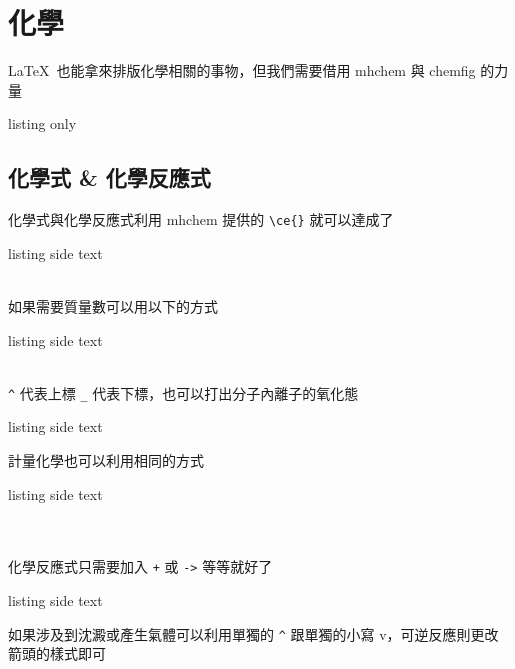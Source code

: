 \chapter{化學}

\LaTeX\ 也能拿來排版化學相關的事物，但我們需要借用 mhchem 與 chemfig 的力量

\begin{tcblisting}{listing only}
\usepackage{mhchem}
\usepackage{chemfig}
\end{tcblisting}

\section{化學式 \& 化學反應式}

化學式與化學反應式利用 mhchem 提供的 \verb`\ce{}` 就可以達成了

\begin{tcblisting}{listing side text}
\\
\\
\end{tcblisting}

如果需要質量數可以用以下的方式

\begin{tcblisting}{listing side text}
\\
\\
\end{tcblisting}

\verb`^` 代表上標 \verb`_` 代表下標，也可以打出分子內離子的氧化態

\begin{tcblisting}{listing side text}
\end{tcblisting}

計量化學也可以利用相同的方式

\begin{tcblisting}{listing side text}
\\
\\
\\
\end{tcblisting}

化學反應式只需要加入 \verb`+` 或 \verb`->` 等等就好了

\begin{tcblisting}{listing side text}
\end{tcblisting}

如果涉及到沈澱或產生氣體可以利用單獨的 \verb`^` 跟單獨的小寫 v，可逆反應則更改箭頭的樣式即可

